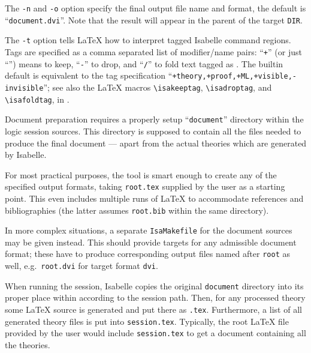 \begin{isabellebody}
\begin{isamarkuptext}
  \medskip The \verb|-n| and \verb|-o| option specify
  the final output file name and format, the default is ``\verb|document.dvi|''.  Note that the result will appear in the parent of
  the target \verb|DIR|.

  \medskip The \verb|-t| option tells {\LaTeX} how to interpret
  tagged Isabelle command regions.  Tags are specified as a comma
  separated list of modifier/name pairs: ``\verb|+|'' (or just ``'') means to keep, ``\verb|-|'' to drop, and ``\verb|/|'' to
  fold text tagged as .  The builtin default is equivalent
  to the tag specification ``\verb|+theory,+proof,+ML,+visible,-invisible|''; see also the {\LaTeX}
  macros \verb|\isakeeptag|, \verb|\isadroptag|, and
  \verb|\isafoldtag|, in \hyperlink{file.~~/lib/texinputs/isabelle.sty}{\mbox{}}.

  \medskip Document preparation requires a properly setup ``\verb|document|'' directory within the logic session sources.  This
  directory is supposed to contain all the files needed to produce the
  final document --- apart from the actual theories which are
  generated by Isabelle.

  \medskip For most practical purposes, the \hyperlink{tool.document}{\mbox{}} tool is
  smart enough to create any of the specified output formats, taking
  \verb|root.tex| supplied by the user as a starting point.  This
  even includes multiple runs of {\LaTeX} to accommodate references
  and bibliographies (the latter assumes \verb|root.bib| within
  the same directory).

  In more complex situations, a separate \verb|IsaMakefile| for
  the document sources may be given instead.  This should provide
  targets for any admissible document format; these have to produce
  corresponding output files named after \verb|root| as well,
  e.g.\ \verb|root.dvi| for target format \verb|dvi|.

  \medskip When running the session, Isabelle copies the original
  \verb|document| directory into its proper place within
  \hyperlink{setting.ISABELLE-BROWSER-INFO}{\mbox{}} according to the session path.
  Then, for any processed theory  some {\LaTeX} source is
  generated and put there as \verb|.tex|.
  Furthermore, a list of all generated theory files is put into
  \verb|session.tex|.  Typically, the root {\LaTeX} file provided
  by the user would include \verb|session.tex| to get a document
  containing all the theories.


\end{isamarkuptext}
\end{isabellebody}

